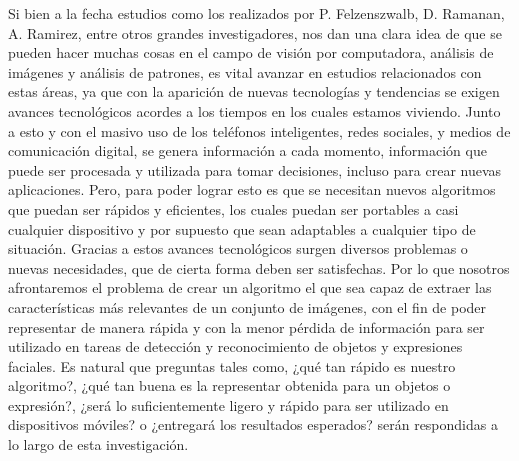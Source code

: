 Si bien a la fecha estudios como los realizados por P. Felzenszwalb, D. Ramanan, A. Ramirez, entre otros grandes investigadores, nos dan una clara idea de que se pueden hacer muchas cosas en el campo de visión por computadora, análisis de imágenes y análisis de patrones, es vital avanzar en estudios relacionados con estas áreas, ya que con la aparición de nuevas tecnologías y tendencias se exigen avances tecnológicos acordes a los tiempos en los cuales estamos viviendo. Junto a esto y con el masivo uso de los teléfonos inteligentes, redes sociales, y medios de comunicación digital, se genera información a cada momento, información que puede ser procesada y utilizada para tomar decisiones, incluso para crear nuevas aplicaciones. Pero, para poder lograr esto es que se necesitan nuevos algoritmos que puedan ser rápidos y eficientes, los cuales puedan ser portables a casi cualquier dispositivo y por supuesto que sean adaptables a cualquier tipo de situación. Gracias a estos avances tecnológicos surgen diversos problemas o nuevas necesidades, que de cierta forma deben ser satisfechas. Por lo que nosotros afrontaremos el problema de crear un algoritmo el que sea capaz de extraer las características más relevantes de un conjunto de imágenes, con el fin de poder representar de manera rápida y con la menor pérdida de información para ser utilizado en tareas de detección y reconocimiento de objetos y expresiones faciales. Es natural que preguntas tales como, ¿qué tan rápido es nuestro algoritmo?, ¿qué tan buena es la representar obtenida para un objetos o expresión?, ¿será lo suficientemente ligero y rápido para ser utilizado en dispositivos móviles? o ¿entregará los resultados esperados? serán respondidas a lo largo de esta investigación.

